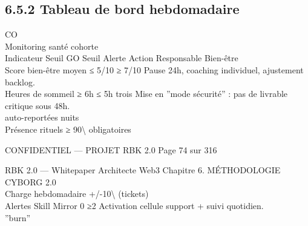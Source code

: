 \documentclass[12pt,landscape,a4paper]{article}
\newenvironment{confidential}
{\begin{tcolorbox}[
    colback=rbkred!5!white,
    colframe=rbkred!75!black,
    title=CONFIDENTIEL,
    fonttitle=\bfseries\color{white},
    coltitle=rbkred!75!black,
    breakable,
    enhanced,
    frame hidden,
    borderline west={2pt}{0pt}{rbkred!75!black}
]}
{\end{tcolorbox}}
\begin{document}
\subsection{6.5.2 Tableau de bord hebdomadaire}
CO\\
Monitoring santé cohorte\\
\vspace{0.5em}
\vspace{0.5em}
\vspace{0.5em}
Indicateur                    Seuil GO         Seuil Alerte    Action Responsable Bien-être\\
Score bien-être moyen         ≤ 5/10             ≥ 7/10        Pause 24h, coaching individuel, ajustement backlog.\\
Heures de sommeil               ≥ 6h           ≤ 5h trois      Mise en ”mode sécurité” : pas de livrable critique sous 48h.\\
auto-reportées                                    nuits\\
Présence rituels               ≥ 90\textbackslash{}%
obligatoires\\
\vspace{0.5em}
\vspace{0.5em}
\vspace{0.5em}
\vspace{0.5em}
\begin{confidential}CONFIDENTIEL — PROJET RBK 2.0                                        Page 74 sur 316\end{confidential}
RBK 2.0 — Whitepaper Architecte Web3                                                                 Chapitre 6. MÉTHODOLOGIE CYBORG 2.0\\
\vspace{0.5em}
\vspace{0.5em}
\vspace{0.5em}
Charge hebdomadaire    +/-10\textbackslash{}%
(tickets)\\
Alertes Skill Mirror        0            ≥2         Activation cellule support + suivi quotidien.\\
”burn”\\
\vspace{0.5em}
\vspace{0.5em}
\end{document}
